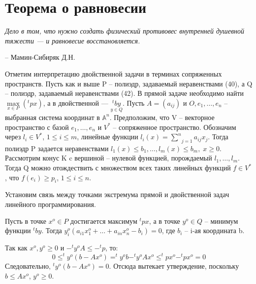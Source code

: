 \chapter{Теорема о равновесии}
\label{cha:18}

\epigraph{
	\textit{Дело в том, что нужно создать физический противовес внутренней душевной тяжести — и равновесие восстановляется.}}
{-- Мамин-Сибиряк Д.Н.}

Отметим интерпретацию двойственной задачи в терминах сопряженных пространств. Пусть как и выше P – полиэдр, задаваемый неравенствами (40), а Q – полиэдр, задаваемый неравенствами (42). В прямой задаче необходимо найти $\underset{x \in P}{\max} (^tpx)$, а в двойственной — $\underset{y \in Q}{^tby}$. Пусть $A = (a_{ij})$ и $O, e_1, \dots, e_n$ – выбранная система координат в $\mathbb{A}^n$. Предположим, что V – векторное пространство с базой $e_1, \dots, e_n$ и $V^*$ – сопряженное пространство. Обозначим через $l_i \in V^*$, $1 \le i \le m$, линейные функции $l_i (x) = \underset{j=1}{\overset{n}{\sum}}a_{ij}x_j$. Тогда полиэдр P задается неравенствами $l_1 (x) \le b_1, \dots, l_m (x) \le b_m, \; x\ge 0$. Рассмотрим конус K c вершиной – нулевой функцией, порождаемый $l_1, \dots, l_m$. Тогда Q можно отождествить с множеством всех таких линейных функций $f \in V^*$, что $f(e_i) \ge p_i$, $1 \le i \le n$.

Установим связь между точками экстремума прямой и двойственной задач линейного программирования. 

\begin{theorem}\label{cha:18/the:1}
	Пусть в точке $x^o \in P$ достигается максимум $^tpx$, а в точке $y^o \in Q$ – минимум функции $^tby$. Тогда $y_i^o (a_{i1}x_1^o + \dots + a_{in}x_n^o − b_i) = 0$, где $b_i$ – i-ая координата b.
\end{theorem}
\begin{Proof}
	Так как $x^o, y^o \ge 0$ и $−^ty^oA \le −^tp$, то:
	$$0 \le ^t y^o (b - A x^o) = ^t y^o b - ^t y^o A x^o \le ^t p x^o - ^t p x^o = 0$$
	Следовательно, $^t y^o (b - A x^o) = 0$. Отсюда вытекает утверждение, поскольку $b \le Ax^o$, $y^o \ge 0$.
\end{Proof}
